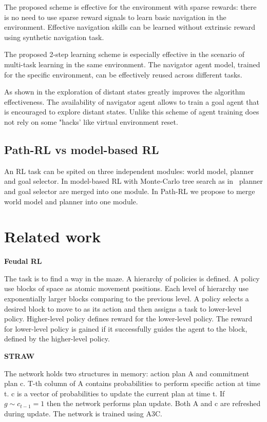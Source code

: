\documentclass{article}
\begin{document}
The proposed scheme is effective for the environment with sparse rewards: there is no need to use sparse reward signals to learn basic navigation in the environment. Effective navigation skills can be learned without extrinsic reward using synthetic navigation task.

The proposed 2-step learning scheme is especially effective in the scenario of multi-task learning in the same environment. The navigator agent model, trained for the specific environment, can be effectively reused across different tasks.

As shown in \citep{Ecoffet2019GoExploreAN} the exploration of distant states greatly improves the algorithm effectiveness. The availability of navigator agent allows to train a goal agent that is encouraged to explore distant states. Unlike \citep{Ecoffet2019GoExploreAN} this scheme of agent training does not rely on some "hacks' like virtual environment reset.

\subsection{Path-RL vs model-based RL}

An RL task can be spited on three independent modules: world model, planner and goal selector. In model-based RL with Monte-Carlo tree search as in~\citep{Schrittwieser2020MasteringAG} planner and goal selector are merged into one module. In Path-RL we propose to merge world model and planner into one module.

\section{Related work}

\textbf{Feudal RL}~\citep{Dayan1992FeudalRL}

The task is to find a way in the maze. A hierarchy of policies is defined. A policy use blocks of space as atomic movement positions. Each level of hierarchy use exponentially larger blocks comparing to the previous level. A policy selects a desired block to move to as its action and then assigns a task to lower-level policy. Higher-level policy defines reward for the lower-level policy. The reward for lower-level policy is gained if it successfully guides the agent to the block, defined by the higher-level policy.

\textbf{STRAW}~\citep{Vezhnevets2016StrategicAW}

The network holds two structures in memory: action plan A and commitment plan c. T-th column of A contains probabilities to perform specific action at time t. c is a vector of probabilities to update the current plan at time t. If $g \sim c_{t-1} = 1$ then the network performs plan update. Both A and c are refreshed during update. The network is trained using A3C.
\end{document}
